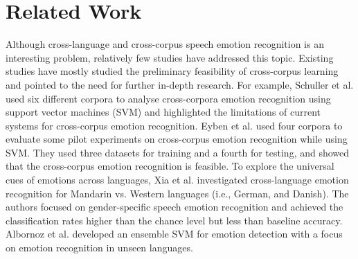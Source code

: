 \documentclass[a4paper]{article}
\newcommand*{\JE}[1]{\textcolor{magenta}{#1}}
\begin{document}


\section{Related Work}
\label{sec:back}

Although cross-language and cross-corpus speech emotion recognition is an interesting problem, relatively few studies have addressed this topic. Existing studies have mostly studied the preliminary feasibility of cross-corpus learning and pointed to the need for further in-depth research. For example, Schuller et al. \cite{schuller2010cross} used six different corpora to analyse cross-corpora emotion recognition using support vector machines (SVM) and highlighted the limitations of current systems for cross-corpus emotion recognition. Eyben et al. \cite{eyben2010cross} used four corpora to evaluate some pilot experiments on cross-corpus emotion recognition while using SVM. They used three datasets for training and a fourth for testing, and showed that the cross-corpus emotion recognition is feasible. To explore the universal cues of emotions across languages, Xia et al. \cite{xiao2016speech} investigated cross-language emotion recognition for Mandarin vs. Western languages (i.e., German, and Danish). The authors focused on gender-specific speech emotion recognition and achieved the classification rates higher than the chance level but less than baseline accuracy.  Albornoz et al. \cite{albornoz2017emotion} developed an ensemble SVM for emotion detection with a focus on emotion recognition in unseen languages. 
\end{document}
